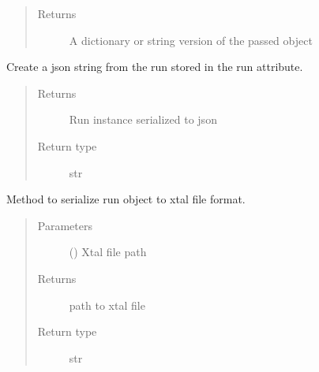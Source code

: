 \documentclass[letterpaper,10pt,english]{sphinxmanual}
\begin{document}
\begin{fulllineitems}
\begin{fulllineitems}
\begin{quote}
\begin{description}
\item[{Returns}] \leavevmode
A dictionary or string version of the passed object

\end{description}\end{quote}

\end{fulllineitems}


\begin{fulllineitems}
\label{\detokenize{polo.utils:polo.utils.io_utils.XtalWriter.run_to_dict}}
Create a json string from the run stored in the run attribute.
\begin{quote}\begin{description}
\item[{Returns}] \leavevmode
Run instance serialized to json

\item[{Return type}] \leavevmode
str

\end{description}\end{quote}

\end{fulllineitems}


\begin{fulllineitems}
\label{\detokenize{polo.utils:polo.utils.io_utils.XtalWriter.write_xtal_file}}
Method to serialize run object to xtal file format.
\begin{quote}\begin{description}
\item[{Parameters}] \leavevmode
{} () \textendash{} Xtal file path

\item[{Returns}] \leavevmode
path to xtal file

\item[{Return type}] \leavevmode
str


\end{description}
\end{quote}
\end{fulllineitems}
\end{fulllineitems}
\end{document}
